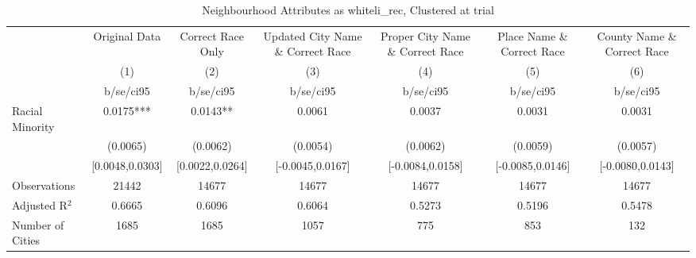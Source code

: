 \documentclass{article}
\begin{document}
\begin{table}[htbp]\centering
\def\sym#1{\ifmmode^{#1}\else\(^{#1}\)\fi}
\caption{Neighbourhood Attributes as whiteli\_rec, Clustered at trial}
\begin{tabular}{l*{6}{c}}
\toprule
                    &\multicolumn{1}{c}{Original Data}&\multicolumn{1}{c}{Correct Race Only}&\multicolumn{1}{c}{Updated City Name \& Correct Race}&\multicolumn{1}{c}{Proper City Name \& Correct Race}&\multicolumn{1}{c}{Place Name \& Correct Race}&\multicolumn{1}{c}{County Name \& Correct Race}\\\cmidrule(lr){2-2}\cmidrule(lr){3-3}\cmidrule(lr){4-4}\cmidrule(lr){5-5}\cmidrule(lr){6-6}\cmidrule(lr){7-7}
                    &\multicolumn{1}{c}{(1)}   &\multicolumn{1}{c}{(2)}   &\multicolumn{1}{c}{(3)}   &\multicolumn{1}{c}{(4)}   &\multicolumn{1}{c}{(5)}   &\multicolumn{1}{c}{(6)}   \\
                    &   b/se/ci95   &   b/se/ci95   &   b/se/ci95   &   b/se/ci95   &   b/se/ci95   &   b/se/ci95   \\
\midrule
Racial Minority     &      0.0175***&      0.0143** &      0.0061   &      0.0037   &      0.0031   &      0.0031   \\
                    &    (0.0065)   &    (0.0062)   &    (0.0054)   &    (0.0062)   &    (0.0059)   &    (0.0057)   \\
                    &[0.0048,0.0303]   &[0.0022,0.0264]   &[-0.0045,0.0167]   &[-0.0084,0.0158]   &[-0.0085,0.0146]   &[-0.0080,0.0143]   \\
\midrule
Observations        &       21442   &       14677   &       14677   &       14677   &       14677   &       14677   \\
Adjusted R$^2$      &      0.6665   &      0.6096   &      0.6064   &      0.5273   &      0.5196   &      0.5478   \\
Number of Cities    &        1685   &        1685   &        1057   &         775   &         853   &         132   \\
\bottomrule
\end{tabular}
\end{table}
\end{document}
